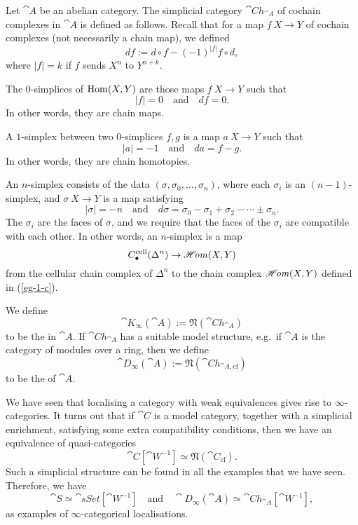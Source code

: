 \begin{example}
    Let $\cat A$ be an abelian category.
    The simplicial category $\cat{Ch}_{\cat A}$ of cochain complexes in $\cat A$
    is defined as follows.
    Recall that for a map $f\:X\to Y$ of cochain complexes (not necessarily a chain map),
    we defined 
    \[ df:=d\circ f-(-1)^{|f|}f\circ d, \]
    where $|f|=k$ if $f$ sends $X^n$ to $Y^{n+k}$.
    \begin{itms}
        \item The $0$-simplices of $\operatorname{Hom}(X,Y)$ are those maps $f\:X\to Y$
        such that 
        \[ |f|=0\quad\text{and}\quad df=0. \]
        In other words, they are chain maps.
        \item A $1$-simplex between two $0$-simplices $f,g$ is a map $a\:X\to Y$
        such that 
        \[ |a|=-1\quad\text{and}\quad da=f-g. \]
        In other words, they are chain homotopies.
        \item An $n$-simplex consists of the data $(\sigma,\sigma_0,\dotsc,\sigma_n)$,
        where each $\sigma_i$ is an $(n-1)$-simplex,
        and $\sigma\:X\to Y$ is a map satisfying
        \[ |\sigma|=-n\quad\text{and}\quad d\sigma=\sigma_0-\sigma_1+\sigma_2-\cdots\pm\sigma_n. \]
        The $\sigma_i$ are the faces of $\sigma$, and we require that
        the faces of the $\sigma_i$ are compatible with each other.
        In other words, an $n$-simplex is a map 
        \[ C_\bullet^{\textrm{cell}}(\Delta^n)\to\mathscr{H}\mkern-3mu\mathit{om}(X,Y) \]
        from the cellular chain complex of $\Delta^n$
        to the chain complex $\mathscr{H}\mkern-3mu\mathit{om}(X,Y)$ defined in (\ref{eg-1-c}).
    \end{itms}
    We define 
    \[\cat K_\infty(\cat A):=\mathfrak N(\cat{Ch}_{\cat A})\]
    to be the  in $\cat A$.
    If $\cat{Ch}_{\cat A}$ has a suitable model structure,
    e.g.\ if $\cat A$ is the category of modules over a ring, then we define 
    \[\cat D_\infty(\cat A):=\mathfrak N(\cat{Ch}_{\cat A,\mathrm{cf}})\]
    to be the  of $\cat A$. \varqed
\end{example}

\begin{remark}
    We have seen that localising a category with weak equivalences
    gives rise to $\infty$-categories.
    It turns out that if $\cat C$ is a model category,
    together with a simplicial enrichment,
    satisfying some extra compatibility conditions,
    then we have an equivalence of quasi-categories
    \[ \cat C[\cat W^{-1}]\simeq\mathfrak N(\cat C_{\mathrm{cf}}). \]
    Such a simplicial structure can be found in all the examples that we have seen.
    Therefore, we have
    \[ \cat S\simeq\cat{sSet}[\cat W^{-1}]\quad\text{and}\quad
    \cat D_\infty(\cat A)\simeq\cat{Ch}_{\cat A}[\cat W^{-1}], \]
    as examples of $\infty$-categorical localisations. \varqed
\end{remark}

